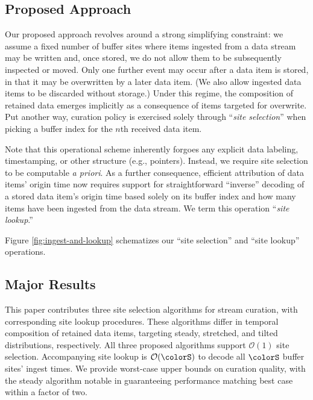 \subsection{Proposed Approach}


Our proposed approach revolves around a strong simplifying constraint: we assume a fixed number of buffer sites where items ingested from a data stream may be written and, once stored, we do not allow them to be subsequently inspected or moved.
Only one further event may occur after a data item is stored, in that it may be overwritten by a later data item.
(We also allow ingested data items to be discarded without storage.)
Under this regime, the composition of retained data emerges implicitly as a consequence of items targeted for overwrite.
Put another way, curation policy is exercised solely through ``\textit{site selection}'' when picking a buffer index for the $n$th received data item.

Note that this operational scheme inherently forgoes any explicit data labeling, timestamping, or other structure (e.g., pointers).
Instead, we require site selection to be computable \textit{a priori}.
As a further consequence, efficient attribution of data items' origin time now requires support for straightforward ``inverse'' decoding of a stored data item's origin time based solely on its buffer index and how many items have been ingested from the data stream.
We term this operation ``\textit{site lookup}.''



Figure \ref{fig:ingest-and-lookup} schematizes our ``site selection'' and ``site lookup'' operations.

\subsection{Major Results}

This paper contributes three site selection algorithms for stream curation, with corresponding site lookup procedures.
These algorithms differ in temporal composition of retained data items, targeting steady, stretched, and tilted distributions, respectively.
All three proposed algorithms support $\mathcal{O}(1)$ site selection.
Accompanying site lookup is $\mathcal{O}(\colorS)$ to decode all $\colorS$ buffer sites' ingest times.
We provide worst-case upper bounds on curation quality, with the steady algorithm notable in guaranteeing performance matching best case within a factor of two.
